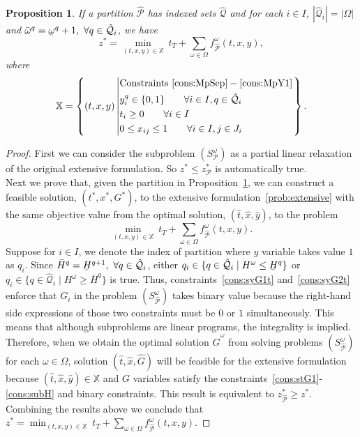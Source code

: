 \documentclass[11pt]{article}
\newtheorem{proposition}[theorem]{Proposition}
\renewcommand{\underbar}{\underaccent{\bar}}
\begin{document}
	\begin{proposition} \label{prop:finestPar}
		If a partition \(\hat{\mathcal{P}}\) has indexed sets \(\hat{\mathcal{Q}}\) and for each \(i \in I\), \(|\hat{\mathcal{Q}}_i| = |\Omega|\) and \(\bar{\omega}^q = \underbar{\omega}^q + 1,\ \forall q \in \hat{\mathcal{Q}}_i\), we have \[z^* = \min_{(t,x,y) \in \mathbb{X}}\ t_T + \sum_{\omega \in \Omega} f^\omega_{\hat{\mathcal{P}}}(t,x,y),\]
		where 
		\begin{equation*}
		\mathbb{X} = \left\{(t,x,y) \left| 
		\begin{aligned}
		& \text{Constraints } \eqref{cons:MpSep}-\eqref{cons:MpY1}\\ 
		&y_i^q \in \{0,1\} \qquad \forall i \in I, q \in \hat{\mathcal{Q}}_i\\
		& t_i \geq 0 \qquad \forall i \in I\\
		& 0 \leq x_{ij} \leq 1 \qquad \forall i \in I, j \in J_i
		\end{aligned}
		\right. \right\}.
		\end{equation*}
	\end{proposition}
	\begin{proof}
		First we can consider the subproblem \((S_\mathcal{P}^\omega)\) as a partial linear relaxation of the original extensive formulation. So \(z^* \leq z^*_\mathcal{P}\) is automatically true.\\
		\newline
		Next we prove that, given the partition in Proposition~\ref{prop:finestPar}, we can construct a feasible solution, \((t^*,x^*,G^*)\), to the extensive formulation~\eqref{prob:extensive} with the same objective value from the optimal solution, \((\hat{t},\hat{x},\hat{y})\), to the problem
		\[\min_{(t,x,y) \in \mathbb{X}}\ t_T + \sum_{\omega \in \Omega} f^\omega_{\hat{\mathcal{P}}}(t,x,y).\]
		Suppose for \(i \in I\), we denote the index of partition where \(y\) variable takes value \(1\) as \(q_i\). Since \(\bar{H}^q = \underbar{H}^{q + 1},\ \forall q \in \hat{\mathcal{Q}}_i\), either \(q_i \in \{q \in \hat{\mathcal{Q}}_i \mid H^\omega \leq \underbar{H}^q\}\) or \(q_i \in \{q \in \hat{\mathcal{Q}}_i \mid H^\omega \geq \bar{H}^q\}\) is true. Thus, constraints~\eqref{cons:syG1t} and~\eqref{cons:syG2t} enforce that \(G_i\) in the problem \((S_{\hat{\mathcal{P}}}^\omega)\) takes binary value because the right-hand side expressions of those two constraints must be \(0\) or \(1\) simultaneously. This means that although subproblems are linear programs, the integrality is implied. Therefore, when we obtain the optimal solution \(\hat{G}^\omega\) from solving problems \((S_{\hat{\mathcal{P}}}^\omega)\) for each \(\omega \in \Omega\), solution \((\hat{t},\hat{x},\hat{G})\) will be feasible for the extensive formulation because \((\hat{t},\hat{x},\hat{y}) \in \mathbb{X}\) and \(G\) variables satisfy the constraints~\eqref{cons:stG1}-\eqref{cons:subH} and binary constraints. This result is equivalent to \(z_{\hat{\mathcal{P}}}^* \geq z^*\). Combining the results above we conclude that \(z^* = \min_{(t,x,y) \in \mathbb{X}}\ t_T + \sum_{\omega \in \Omega} f^\omega_{\hat{\mathcal{P}}}(t,x,y).\)
	\end{proof}
\end{document}
